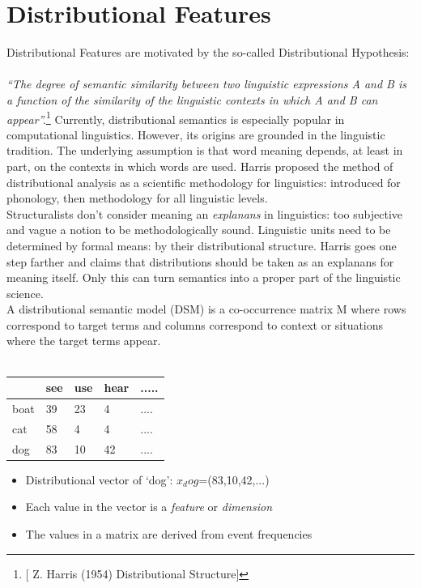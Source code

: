 \documentclass{article}
\begin{document}
\section{Distributional Features}
Distributional Features are motivated by the so-called Distributional Hypothesis:\\ \\
\emph{“The degree of semantic similarity between two linguistic expressions A and B is a function of the similarity of the linguistic contexts in which A and B can appear”.}\footnote{[ Z. Harris (1954) Distributional Structure]}
Currently, distributional semantics is especially popular in computational linguistics. However, its origins are grounded in the linguistic tradition. The underlying assumption is that word meaning depends, at least in part, on the contexts in which words are used. Harris proposed the method of distributional analysis as a scientific methodology for linguistics: introduced for phonology, then methodology for all linguistic levels.\\
Structuralists don’t consider meaning an \emph{explanans} in linguistics: too subjective and vague a notion to be methodologically sound. Linguistic units need to be determined by formal means: by their distributional structure. Harris goes one step farther and claims that distributions should be taken as an explanans for meaning itself. Only this can turn semantics into a proper part of the
linguistic science.\\
A distributional semantic model (DSM) is a co-occurrence matrix M where rows correspond to target terms and columns correspond
to context or situations where the target terms appear.\\ \\
\begin{tabular}{| l | l | l | l | l |}
\hline
\textbf{} & \textbf{see} & \textbf{use} & \textbf{hear} & \textbf{.....} \\ \hline
boat & 39 & 23 & 4 & .... \\ \hline
cat & 58 & 4 & 4 & .... \\ \hline
dog & 83 & 10 & 42 & .... \\ \hline
\end{tabular}
\begin{itemize}
\item Distributional vector of ‘dog’: $x_dog$=(83,10,42,...)
\item Each value in the vector is a \emph{feature} or \emph{dimension}
\item The values in a matrix are derived from event frequencies
\end{itemize}
\end{document}
